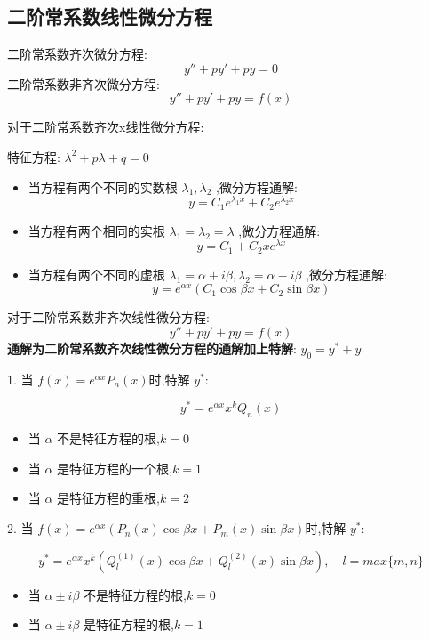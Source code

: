 \subsection{二阶常系数线性微分方程}
\begin{definition}[二阶常系数线性微分方程]
	二阶常系数齐次微分方程:
	$$y''+py'+py=0$$
	二阶常系数非齐次微分方程:
	$$y''+py'+py=f(x)$$
\end{definition}
\begin{theorem}[二阶常系数齐次线性微分方程解]\label{the: 齐次二阶常系数线性微分方程}
	对于二阶常系数齐次x线性微分方程:

	特征方程:  $\lambda^{2}+p\lambda+q=0$

	\begin{itemize}
		\item 当方程有两个不同的实数根 $\lambda_{1},\lambda_{2}$ ,微分方程通解: $$y=C_{1}e^{\lambda_{1} x}+C_{2}e^{\lambda_{2}x}$$
		\item 当方程有两个相同的实根 $\lambda_{1}=\lambda_{2}=\lambda$ ,微分方程通解: $$y=C_{1}+C_{2}xe^{\lambda x}$$
		\item 当方程有两个不同的虚根 $\lambda_{1}=\alpha +i\beta,\lambda_{2}=\alpha-i\beta$ ,微分方程通解: $$y=e^{\alpha x}(C_{1}\cos \beta x+C_{2}\sin \beta x)$$
	\end{itemize}
\end{theorem}
\begin{theorem}[二阶常系数非齐次线性微分方程解]
	对于二阶常系数非齐次线性微分方程:
	$$y''+py'+py=f(x)$$
	\textbf{通解为二阶常系数齐次线性微分方程的通解加上特解}: $y_{0}=y^{*}+y$

	1. 当 $f(x)=e^{\alpha x}P_{n}(x)$时,特解 $y^{*}$:

	$$y^{*}=e^{\alpha x}x^{k}Q_{n}(x)$$
	\begin{itemize}
		\item 当 $\alpha$ 不是特征方程的根,$k=0$
		\item 当 $\alpha$ 是特征方程的一个根,$k=1$
		\item 当 $\alpha$ 是特征方程的重根,$k=2$
	\end{itemize}

	2. 当 $f(x)=e^{\alpha x}(P_{n}(x)\cos \beta x+P_{m}(x)\sin \beta x)$时,特解 $y^{*}$:

	$$y^{*}=e^{\alpha x}x^{k}(Q_{l}^{(1)}(x)\cos \beta x+Q_{l}^{(2)}(x)\sin \beta x),\quad l=max\{m,n\}$$
	\begin{itemize}
		\item 当 $\alpha\pm i\beta$ 不是特征方程的根,$k=0$
		\item 当 $\alpha\pm i\beta$ 是特征方程的根,$k=1$
	\end{itemize}
\end{theorem}

